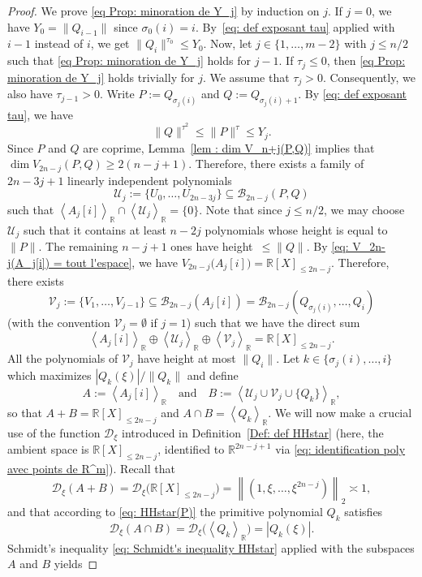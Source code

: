 \documentclass[JEP,XML,SOM,Unicode,NoFloatCountersInSection,published]{cedram}
\newcommand\bR{\mathbb{R}}
\newcommand\cB{\mathcal{B}}
\newcommand\cU{\mathcal{U}}
\newcommand\cV{\mathcal{V}}
\newcommand\HHstar{\mathcal{D}_{\xi}}
\newcommand{\norm}[1]{\left\|#1 \right\|_2}
\newcommand{\normH}[1]{\|#1\|}
\newcommand{\Vect}[2][]{\left\la #2\right\ra_{#1}}
\let\subset \subseteq
\let\la\langle
\let\ra\rangle
\newcommand\AND{\quad\text{and}\quad}
\theoremstyle{definition}
\theoremstyle{plain}
\begin{document}
\begin{proof}
We prove \eqref{eq Prop: minoration de Y_j} by induction on $j$. If $j=0$, we have $Y_0 = \normH{Q_{i-1}}$ since $\sigma_0(i) = i$. By~\eqref{eq: def exposant tau} applied with $i-1$ instead of $i$, we get $\normH{Q_i}^{\tau_0} \leq Y_0$. Now, let $j\in\{1,\dots,m-2\}$ with $j\leq n/2$ such that \eqref{eq Prop: minoration de Y_j} holds for $j-1$. If $\tau_{j}\leq 0$, then \eqref{eq Prop: minoration de Y_j} holds trivially for $j$. We assume that $\tau_{j} > 0$. Consequently, we also have $\tau_{j-1} > 0$. Write $P:= Q_{\sigma_j(i)}$ and $Q:= Q_{\sigma_j(i)+1}$. By \eqref{eq: def exposant tau}, we have
\begin{equation}
\label{eq proof: contrôle H(P) et H(Q) par Y_j}
\normH{Q}^{\tau^2} \leq \normH{P}^{\tau} \leq Y_j.
\end{equation}
Since $P$ and $Q$ are coprime, Lemma~\ref{lem : dim V_n+j(P,Q)} implies that $\dim V_{2n-j}(P,Q)\geq 2(n-j+1)$. Therefore, there exists a family of $2n-3j+1$ linearly independent polynomials
\[
\cU_j:=\{U_0,\dots,U_{2n-3j}\} \subset \cB_{2n-j}(P,Q)
\]
such that $\Vect[\bR]{A_j[i]} \cap \Vect[\bR]{\cU_j} = \{0\}$. Note that since $j\leq n/2$, we may choose $\cU_j$ such that it contains at least $n-2j$ polynomials whose height is equal to $\normH{P}$. The remaining $n-j+1$ ones have height~$\leq \normH{Q}$. By \eqref{eq: V_2n-j(A_j[i]) = tout l'espace}, we have $V_{2n-j}\big(A_j[i]\big) = \bR[X]_{\leq 2n-j}$. Therefore, there exists
\[
\cV_j:=\{V_1,\dots,V_{j-1}\} \subset \cB_{2n-j}(A_j[i]) = \cB_{2n-j}(Q_{\sigma_j(i)},\dots, Q_i)
\]
(with the convention $\cV_j = \emptyset$ if $j=1$) such that we have the direct sum
\[
\Vect[\bR]{A_j[i]} \oplus \Vect[\bR]{\cU_j} \oplus \Vect[\bR]{\cV_j} = \bR[X]_{\leq 2n-j}.
\]
All the polynomials of $\cV_j$ have height at most $\normH{Q_i}$. Let $k\in\{\sigma_j(i),\dots,i\}$ which maximizes $|Q_k(\xi)|/\normH{Q_k}$ and define
\[
A:= \Vect[\bR]{A_j[i]} \AND B:= \Vect[\bR]{\cU_j \cup \cV_j \cup \{Q_k\}},
\]
so that $A + B = \bR[X]_{\leq 2n-j}$ and $A\cap B = \Vect[\bR]{Q_k}$. We will now make a crucial use of the function $\HHstar$ introduced in Definition~\ref{Def: def HHstar} (here, the ambient space is $\bR[X]_{\leq 2n-j}$, identified to $\bR^{2n-j+1}$ via \eqref{eq: identification poly avec points de R^m}). Recall that
\[
\HHstar(A+B) = \HHstar\big(\bR[X]_{\leq 2n-j}\big) = \norm{(1,\xi,\dots,\xi^{2n-j})} \asymp 1,
\]
and that according to \eqref{eq: HHstar(P)} the primitive polynomial $Q_k$ satisfies
\[
\HHstar(A\cap B) = \HHstar\big(\Vect[\bR]{Q_k}\big) = |Q_k(\xi)|.
\]
Schmidt's inequality \eqref{eq: Schmidt's inequality HHstar} applied with the subspaces $A$ and $B$ yields

\end{proof}
\end{document}
